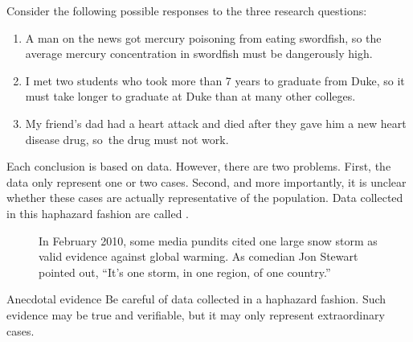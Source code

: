 
\noindent%
Consider the following possible responses to the three research questions:
\begin{enumerate}
\setlength{\itemsep}{0mm}
\item
    A man on the news got mercury poisoning from eating swordfish,
    so the average mercury concentration in swordfish must be
    dangerously high.
\item\label{iKnowThreeStudentsWhoTookMoreThan7YearsToGraduateAtDuke}
    I met two students who took more than 7 years to graduate
    from Duke, so it must take longer to graduate at Duke than
    at many other colleges.
\item\label{myFriendsDadDiedAfterSulphinpyrazon}
    My friend's dad had a heart attack and died after they gave
    him a new heart disease drug, so~the drug must not work.
\end{enumerate}
Each conclusion is based on data.
However, there are two problems.
First, the data only represent one or two cases.
Second, and more importantly, it is unclear whether these cases
are actually representative of the population.
Data collected in this haphazard fashion are called
.

\setlength{\captionwidth}{\textwidth-75mm}
\begin{figure}[h]
  \centering
  \hspace{8mm}\hspace{4mm}
  \begin{minipage}[b]{\textwidth-75mm}
    \caption[anecdotal evidence]{In February 2010,
        some media pundits cited one large snow storm
        as valid evidence against global warming.
        As comedian Jon Stewart pointed out,
        ``It's one storm, in one region, of one country.''
    \label{mnWinter}}
  \end{minipage}
\end{figure}
\setlength{\captionwidth}{\mycaptionwidth}

\begin{onebox}{Anecdotal evidence}
Be careful of data collected in a haphazard fashion.
Such evidence may be true and verifiable, but it may
only represent extraordinary cases.
\end{onebox}

